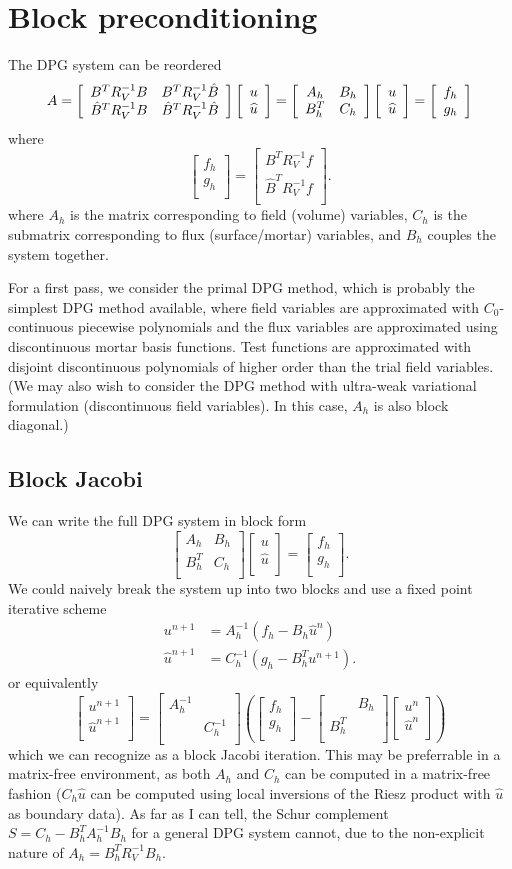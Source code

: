 \documentclass{article}
\newcommand{\LRp}[1]{\left( #1 \right)}
\newcommand{\uh}{\widehat{u}}
\def\arr#1#2#3#4{\left[
\begin{array}{cc}
#1 & #2\\
#3 & #4\\
\end{array}
\right]}
\def\vecttwo#1#2{\left[
\begin{array}{c}
#1\\
#2\\
\end{array}
\right]}
\begin{document}
\section{Block preconditioning}

The DPG system can be reordered 
\[
A = \left[\begin{array}{c c}
B^TR_V^{-1}B & B^TR_V^{-1}\hat{B}\\
\hat{B}^TR_V^{-1}B & \hat{B}^TR_V^{-1}\hat{B}
\end{array}
\right]\vecttwo{u}{\uh} = \arr{A_h}{B_h}{B_h^T}{C_h}\vecttwo{u}{\uh} = \vecttwo{f_h}{g_h}
\]
where 
\[
\vecttwo{f_h}{g_h} = \vecttwo{B^TR_V^{-1} f}{\hat{B}^TR_V^{-1}f}.
\]
where $A_h$ is the matrix corresponding to field (volume) variables, $C_h$ is the submatrix corresponding to flux (surface/mortar) variables, and $B_h$ couples the system together.  

For a first pass, we consider the primal DPG method, which is probably the simplest DPG method available, where field variables are approximated with $C_0$-continuous piecewise polynomials and the flux variables are approximated using discontinuous mortar basis functions.  Test functions are approximated with disjoint discontinuous polynomials of higher order than the trial field variables.  (We may also wish to consider the DPG method with ultra-weak variational formulation (discontinuous field variables).  In this case, $A_h$ is also block diagonal.)

\subsection{Block Jacobi}

We can write the full DPG system in block form
\[
\arr{A_h}{B_h}{B_h^T}{C_h}\vecttwo{u}{\uh} = \vecttwo{f_h}{g_h}.
\]
We could naively break the system up into two blocks and use a fixed point iterative scheme
\begin{align*}
u^{n+1} &= A_h^{-1}(f_h-B_h\uh^{n})\\
\uh^{n+1} &= C_h^{-1}(g_h-B_h^Tu^{n+1}).
\end{align*}
or equivalently
\[
\vecttwo{u^{n+1}}{\uh^{n+1}} = \arr{A_h^{-1}}{}{}{C_h^{-1}}\LRp{\vecttwo{f_h}{g_h} - \arr{}{B_h}{B_h^T}{}\vecttwo{u^n}{\uh^n}}
\]
which we can recognize as a block Jacobi iteration.  This may be preferrable in a matrix-free environment, as both $A_h$ and $C_h$ can be computed in a matrix-free fashion ($C_h\uh$ can be computed using local inversions of the Riesz product with $\uh$ as boundary data).  As far as I can tell, the Schur complement $S = C_h-B_h^TA_h^{-1}B_h$ for a general DPG system cannot, due to the non-explicit nature of $A_h = B_h^TR_V^{-1}B_h$.
\end{document}
